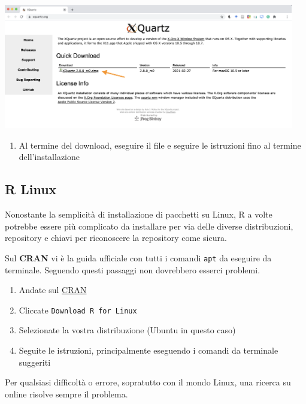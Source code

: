 \documentclass[
]{book}
\providecommand{\tightlist}{%
  \setlength{\itemsep}{0pt}\setlength{\parskip}{0pt}}
\begin{document}
\includegraphics[width=0.95\textwidth,height=\textheight]{images/install_Mac_XQuartz.png}

\begin{enumerate}
\def\labelenumi{\arabic{enumi}.}
\setcounter{enumi}{4}
\tightlist
\item
  Al termine del download, eseguire il file e seguire le istruzioni fino al termine dell'installazione
\end{enumerate}

\hypertarget{r-linux}{%
\subsection{R Linux}\label{r-linux}}

Nonostante la semplicità di installazione di pacchetti su Linux, R a volte potrebbe essere più complicato da installare per via delle diverse distribuzioni, repository e chiavi per riconoscere la repository come sicura.

Sul \textbf{CRAN} vi è la guida ufficiale con tutti i comandi \texttt{apt} da eseguire da terminale. Seguendo questi passaggi non dovrebbero esserci problemi.

\begin{enumerate}
\def\labelenumi{\arabic{enumi}.}
\tightlist
\item
  Andate sul \href{https://cran.r-project.org/}{CRAN}
\item
  Cliccate \texttt{Download\ R\ for\ Linux}
\item
  Selezionate la vostra distribuzione (Ubuntu in questo caso)
\item
  Seguite le istruzioni, principalmente eseguendo i comandi da terminale suggeriti
\end{enumerate}

Per qualsiasi difficoltà o errore, sopratutto con il mondo Linux, una ricerca su online risolve sempre il problema.
\end{document}

